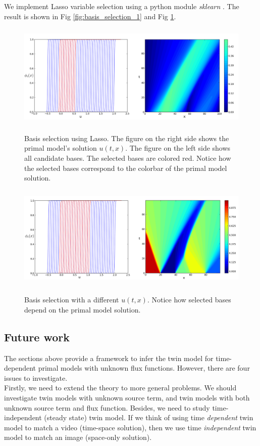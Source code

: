 \documentclass[a4paper,onecolumn]{article}
\theoremstyle{remark}
\begin{document}
\noindent We implement Lasso variable selection using a python module \emph{sklearn} \cite{sklearn}.
The result is shown in Fig \ref{fig:basis_selection_1} and Fig \ref{fig:basis_selection_2}.
\begin{figure}[H]\begin{center}
    \includegraphics[height=5cm]{all.png}
    \caption{Basis selection using Lasso. The figure on the right side shows
    the primal model's solution $u(t,x)$. The figure on the left side shows all
    candidate bases. The selected bases are colored red. Notice how the selected
    bases correspond to the colorbar of the primal model solution.}
    \label{fig:basis_selection_1}
    \includegraphics[height=5cm]{all2.png}
    \caption{Basis selection with a different $u(t,x)$. Notice
    how selected bases depend on the primal model solution.}
    \label{fig:basis_selection_2}
\end{center}
\end{figure}

\subsection{Future work}
The sections above provide a framework to infer the twin model for time-dependent primal models 
with unknown flux functions. However, there are four issues to investigate.\\

\noindent Firstly, we need to extend the theory to more general problems.
We should investigate twin models with unknown source term, and
twin models with both unknown source term and flux function.
Besides, we need to study time-independent (steady state) twin model.
If we think of using time \emph{dependent} twin model to match a video (time-space solution),
then we use time \emph{independent} twin model to match an image (space-only solution).\\
\end{document}
